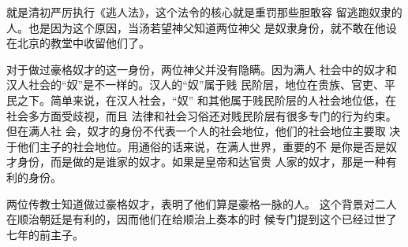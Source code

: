 就是清初严厉执行《逃人法》，这个法令的核心就是重罚那些胆敢容%
留逃跑奴隶的人。也是因为这个原因，当汤若望神父知道两位神父%
是奴隶身份，就不敢在他设在北京的教堂中收留他们了。%
\par
对于做过豪格奴才的这一身份，两位神父并没有隐瞒。因为满人%
社会中的奴才和汉人社会的“奴”是不一样的。汉人的“奴”属于贱%
民阶层，地位在贵族、官吏、平民之下。简单来说，在汉人社会，“奴”%
和其他属于贱民阶层的人社会地位低，在社会多方面受歧视，而且%
法律和社会习俗还对贱民阶层有很多专门的行为约束。但在满人社%
会，奴才的身份不代表一个人的社会地位，他们的社会地位主要取%
决于他们主子的社会地位。用通俗的话来说，在满人世界，重要的不%
是你是否是奴才身份，而是做的是谁家的奴才。如果是皇帝和达官贵%
人家的奴才，那是一种有利的身份。%
\par
两位传教士知道做过豪格奴才，表明了他们算是豪格一脉的人。%
这个背景对二人在顺治朝廷是有利的，因而他们在给顺治上奏本的时%
候专门提到这个已经过世了七年的前主子。%
